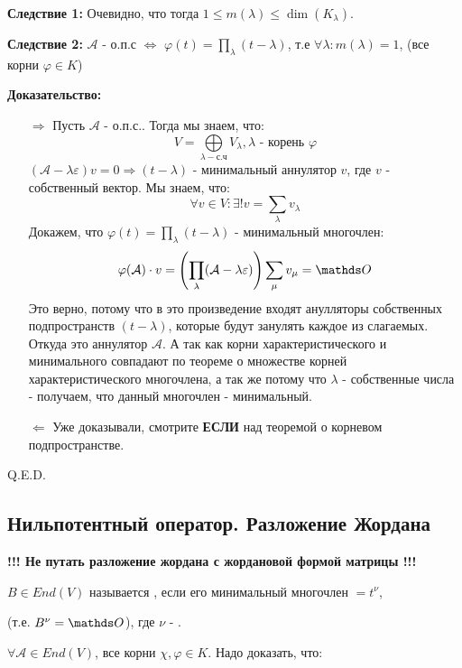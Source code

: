  
\textbf{Следствие 1:} Очевидно, что тогда $1 \leq m(\lambda) \leq \dim (K_{\lambda}) $.

\textbf{Следствие 2:} $\mathcal{A}$ - о.п.с $\Leftrightarrow$ $\varphi(t) = \prod\limits_{\lambda}(t-\lambda)$, т.е $\forall \lambda: m(\lambda) =1$, (все корни $\varphi \in K$)

\textbf{Доказательство:}
\begin{enumerate}
    \item[$\Rightarrow$] Пусть $\mathcal{A}$ - о.п.с.. Тогда мы знаем, что:
    $$V = \bigoplus\limits_{\lambda - \text{с.ч}}V_\lambda, \lambda \text{ - корень } \varphi$$
    $(\mathcal{A}-\lambda \varepsilon)v = 0 \Rightarrow (t-\lambda)$ - минимальный аннулятор $v$, где $v$ - собственный вектор. Мы знаем, что:
    $$\forall v \in V: \exists! v=\sum\limits_{\lambda}v_{\lambda}$$
    Докажем, что  $\varphi(t) = \prod\limits_{\lambda}(t-\lambda)$ - минимальный многочлен:
    $$\varphi(\mathcal{A})\cdot v =\left(\prod\limits_{\lambda}(\mathcal{A}-\lambda \varepsilon)\right)\sum\limits_{\mu}v_{\mu}  = \zero$$
    Это верно, потому что в это произведение входят анулляторы собственных подпространств $(t-\lambda)$, которые будут занулять каждое из слагаемых. Откуда это аннулятор $\mathcal{A}$. А так как корни характеристического и минимального совпадают по  теореме о множестве корней характеристического многочлена, а так же потому что $\lambda$ - собственные числа - получаем, что данный многочлен - минимальный.
    
    \item[$\Leftarrow$] Уже доказывали, смотрите \textbf{ЕСЛИ} над теоремой о корневом подпространстве.
\end{enumerate}
 \hfill Q.E.D.




\pagebreak


\subsection{Нильпотентный оператор. Разложение Жордана }

\textbf{!!! Не путать разложение жордана с жордановой формой матрицы !!!}

 $B \in End(V)$ называется , если его минимальный многочлен $ = t^\nu$,

(т.е. $B^\nu = \zero$), где $\nu$ - .



$\forall \mathcal{A}\in End(V)$, все корни $\chi,\varphi \in K$. Надо доказать, что:

